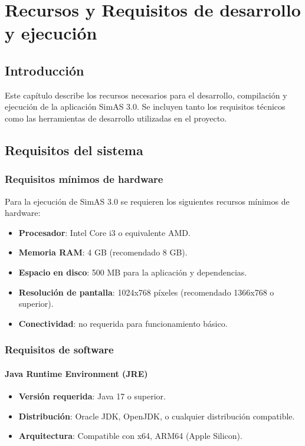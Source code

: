 \chapter{Recursos y Requisitos de desarrollo y ejecución}\label{cap-requisitos-desarrollo-ejecucion}

\section{Introducción}

Este capítulo describe los recursos necesarios para el desarrollo, compilación y ejecución de la aplicación SimAS 3.0. Se incluyen tanto los requisitos técnicos como las herramientas de desarrollo utilizadas en el proyecto.

\section{Requisitos del sistema}

\subsection{Requisitos mínimos de hardware}

Para la ejecución de SimAS 3.0 se requieren los siguientes recursos mínimos de hardware:

\begin{itemize}
    \item \textbf{Procesador}: Intel Core i3 o equivalente AMD.
    \item \textbf{Memoria RAM}: 4 GB (recomendado 8 GB).
    \item \textbf{Espacio en disco}: 500 MB para la aplicación y dependencias.
    \item \textbf{Resolución de pantalla}: 1024x768 píxeles (recomendado 1366x768 o superior).
    \item \textbf{Conectividad}: no requerida para funcionamiento básico.
\end{itemize}

\subsection{Requisitos de software}

\subsubsection{Java Runtime Environment (JRE)}
\begin{itemize}
    \item \textbf{Versión requerida}: Java 17 o superior.
    \item \textbf{Distribución}: Oracle JDK, OpenJDK, o cualquier distribución compatible.
    \item \textbf{Arquitectura}: Compatible con x64, ARM64 (Apple Silicon).
\end{itemize}

